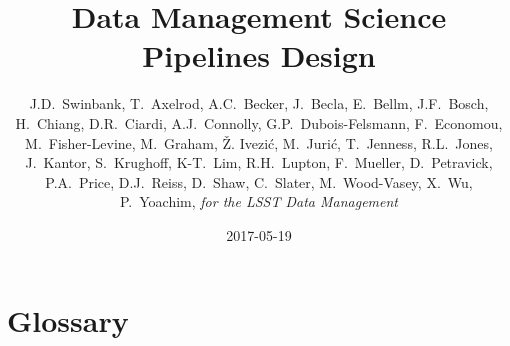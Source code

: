 \documentclass[DM,toc]{lsstdoc}
\title{Data Management Science Pipelines Design}
\author{
    J.D.~Swinbank,
    T.~Axelrod,  A.C.~Becker, J.~Becla, E.~Bellm,
    J.F.~Bosch,  H.~Chiang, D.R.~Ciardi,  A.J.~Connolly,  G.P.~Dubois-Felsmann,
    F.~Economou, M.~Fisher-Levine, M.~Graham, \v{Z}. Ivezi\'c,  M.~Juri\'c,
    T.~Jenness,  R.L.~Jones, J.~Kantor, S.~Krughoff, K-T.~Lim, R.H.~Lupton,
    F.~Mueller,  D.~Petravick, P.A.~Price,  D.J.~Reiss, D.~Shaw, C.~Slater,
    M.~Wood-Vasey, X.~Wu, P.~Yoachim,
     \emph{for the LSST Data Management}
}
\date{2017-05-19}
\begin{document}
\maketitle













\section{Glossary}
\end{document}
